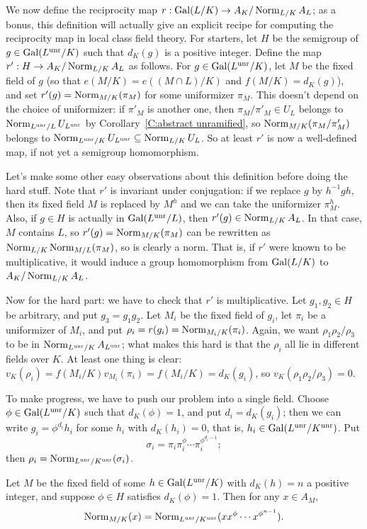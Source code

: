 We now define the reciprocity map $r: \operatorname{Gal}(L/K) \to A_K/\operatorname{Norm}_{L/K} A_L$;
as a bonus, this definition will actually give an explicit recipe for
computing the reciprocity map in local class field theory.
For starters, let $H$ be the semigroup of $g \in \operatorname{Gal}(L^{\operatorname{unr}}/K)$ such
that $d_K(g)$ is a positive integer. Define the map $r': H \to A_K/\operatorname{Norm}_{L/K}
A_{L}$ as follows. For $g \in \operatorname{Gal}(L^{\operatorname{unr}}/K)$, let $M$ be
the fixed field of $g$ (so that $e(M/K) = e((M \cap L)/K)$ and
$f(M/K) = d_K(g)$),
and set $r'(g) = \operatorname{Norm}_{M/K} (\pi_M)$ for some uniformizer $\pi_M$.
This doesn't depend on the choice of uniformizer: if $\pi'_M$
is another one, then $\pi_M/\pi'_M \in U_L$ belongs
to $\operatorname{Norm}_{L^{\operatorname{unr}}/L} U_{L^{\operatorname{unr}}}$ by Corollary~\ref{C:abstract unramified}, so
$\operatorname{Norm}_{M/K} (\pi_M/\pi'_M)$ belongs to
$\operatorname{Norm}_{L^{\operatorname{unr}}/K} U_{L^{\operatorname{unr}}} \subseteq \operatorname{Norm}_{L/K} U_L$.
So at least $r'$ is now a well-defined map, if not yet a semigroup
homomorphism. 

Let's make some other easy observations about this definition before
doing the hard stuff. Note that $r'$ is invariant under conjugation:
if we replace $g$ by $h^{-1}gh$, then its fixed field $M$ is replaced
by $M^h$ and we can take the uniformizer $\pi_M^h$.
Also, if $g \in H$ is actually in $\operatorname{Gal}(L^{\operatorname{unr}}/L)$,
then $r'(g) \in \operatorname{Norm}_{L/K} A_L$. In that case, $M$ contains $L$,
so $r'(g) = \operatorname{Norm}_{M/K}(\pi_M)$ can be rewritten as
$\operatorname{Norm}_{L/K} \operatorname{Norm}_{M/L} (\pi_M)$, so is clearly a norm. That is, if
$r'$ were known to be multiplicative, it would induce a group
homomorphism from $\operatorname{Gal}(L/K)$ to $A_K/\operatorname{Norm}_{L/K} A_L$.

Now for the hard part: we have to check
that $r'$ is multiplicative. Let $g_1, g_2 \in H$ be arbitrary,
and put $g_3 = g_1g_2$.
Let $M_i$ be the fixed field of $g_i$,
let $\pi_i$ be a uniformizer of $M_i$, and put
$\rho_i = r(g_i) = \operatorname{Norm}_{M_i/K}(\pi_i)$. Again, we want
$\rho_1\rho_2/\rho_3$ to be in $\operatorname{Norm}_{L^{\operatorname{unr}}/K} A_{L^{\operatorname{unr}}}$;
what makes this hard is that the $\rho_i$ all lie in different fields
over $K$. 
At least one thing is clear: $v_K(\rho_i) = f(M_i/K) v_{M_i}(\pi_i)
= f(M_i/K) = d_K(g_i)$, so $v_K(\rho_1 \rho_2 /\rho_3) = 0$.

To make progress, we have to push our problem into a single field.
Choose $\phi \in \operatorname{Gal}(L^{\operatorname{unr}}/K)$ such that $d_K(\phi) = 1$,
and put $d_i = d_K(g_i)$; then we can write
$g_i = \phi^{d_i} h_i$ for some $h_i$ with $d_K(h_i) = 0$, that is,
$h_i \in \operatorname{Gal}(L^{\operatorname{unr}}/K^{\operatorname{unr}})$.
Put
\[
\sigma_i = \pi_i \pi_i^\phi \cdots \pi_i^{\phi^{d_i-1}};
\]
then $\rho_i = \operatorname{Norm}_{L^{\operatorname{unr}}/K^{\operatorname{unr}}}(\sigma_i)$.
\begin{prop} \label{prop:norm}
Let $M$ be the fixed field of some $h \in \operatorname{Gal}(L^{\operatorname{unr}}/K)$
with $d_K(h) = n$ a positive integer,
and suppose $\phi \in H$ satisfies $d_K(\phi) = 1$. Then
for any $x \in A_M$,
\[
\operatorname{Norm}_{M/K}(x) = \operatorname{Norm}_{L^{\operatorname{unr}}/K^{\operatorname{unr}}}(x x^\phi \cdots x^{\phi^{n-1}}).
\]
\end{prop}

